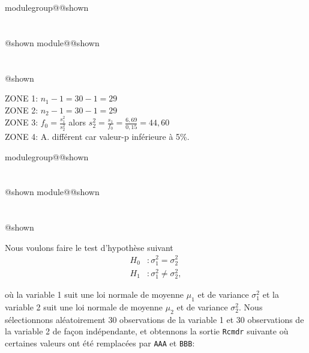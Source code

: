 \documentclass{Evaluation}
\makeatletter
\newcommand{\currentmodulekey}{}
\newcommand{\currentmoduletitle}{}
\newcommand{\currentgroupkey}{}
\newcommand{\currentgrouptitle}{}
\newcommand{\showmoduleifneeded}{%
  \ifx\currentgroupkey\empty\else
    \expandafter\ifx\csname modulegroup@\currentgroupkey @shown\endcsname\relax
      \section*{\currentgrouptitle}%
      \expandafter\gdef\csname modulegroup@\currentgroupkey @shown\endcsname{1}%
    \fi
  \fi
  \expandafter\ifx\csname module@\currentmodulekey @shown\endcsname\relax
    \section*{\currentmoduletitle}%
    \expandafter\gdef\csname module@\currentmodulekey @shown\endcsname{1}%
  \fi
}
\newenvironment{H23}{\showmoduleifneeded}{}
\newenvironment{H24}{\showmoduleifneeded}{}
\makeatother
\begin{document}
\begin{questions}
\begin{H23}

	\begin{solution}
		ZONE 1:  $n_1-1=30-1=29$\\
		ZONE 2:  $n_2-1=30-1=29$\\
		ZONE 3: $\displaystyle f_0= \frac{s_1^2}{s_2^2}$ alors
		$ \displaystyle s_2^2 = \frac{s_1}{f_0}
		= \frac{6,69}{0,15}
		= 44,60	$ \\
		ZONE 4: A. différent car valeur-p inférieure à 5\%.\\
	\end{solution}

\end{H23}

\begin{H24}
\question {} %
Nous voulons faire le test d'hypothèse suivant
\begin{align*}
H_0 &:\sigma_1^2 = \sigma_2^2\\
H_1 &:\sigma_1^2 \neq \sigma_2^2,
\end{align*}

où la variable 1 suit une loi normale de moyenne $\mu_1$ et de variance $\sigma_1^2$ et la variable 2 suit une loi normale de moyenne $\mu_2$ et de variance $\sigma_2^2$. Nous sélectionnons aléatoirement 30 observations de la variable 1 et 30 observations de la variable 2 de façon indépendante, et obtennons la sortie \texttt{Rcmdr} suivante où certaines valeurs ont été remplacées par \texttt{AAA} et \texttt{BBB}:


\end{H24}
\end{questions}
\end{document}
